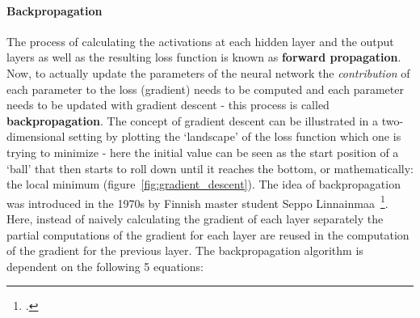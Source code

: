 \paragraph{Backpropagation}\label{par:backprop}
The process of calculating the activations at each hidden layer and the output layers as well as the resulting loss function is known as \textbf{forward propagation}. Now, to actually update the parameters of the neural network the \textit{contribution} of each parameter to the loss (gradient) needs to be computed and each parameter needs to be updated with gradient descent - this process is called \textbf{backpropagation}. The concept of gradient descent can be illustrated in a two-dimensional setting by plotting the `landscape' of the loss function which one is trying to minimize - here the initial value can be seen as the start position of a `ball' that then starts to roll down until it reaches the bottom, or mathematically: the local minimum (figure~\ref{fig:gradient_descent}). The idea of backpropagation was introduced in the 1970s by Finnish master student Seppo Linnainmaa~\footcite{linnainmaa1970representation}. Here, instead of naively calculating the gradient of each layer separately the partial computations of the gradient for each layer are reused in the computation of the gradient for the previous layer. The backpropagation algorithm is dependent on the following 5 equations:

